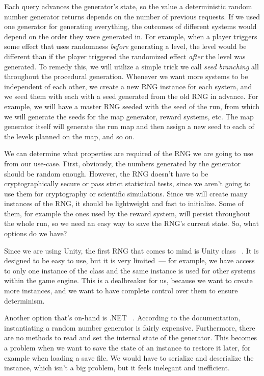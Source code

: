 Each query advances the generator's state, so the value a deterministic random number generator returns depends on the number of previous requests.
If we used one generator for generating everything, the outcomes of different systems would depend on the order they were generated in.
For example, when a player triggers some effect that uses randomness \emph{before} generating a level, the level would be different than if the player triggered the randomized effect \emph{after} the level was generated.
To remedy this, we will utilize a simple trick we call \emph{seed branching} all throughout the procedural generation.
Whenever we want more systems to be independent of each other, we create a new RNG instance for each system, and we seed them with each with a seed generated from the old RNG in advance.
For example, we will have a master RNG seeded with the seed of the run, from which we will generate the seeds for the map generator, reward systems, etc.
The map generator itself will generate the run map and then assign a new seed to each of the levels planned on the map, and so on.

We can determine what properties are required of the RNG we are going to use from our use-case.
First, obviously, the numbers generated by the generator should be random enough.
However, the RNG doesn't have to be cryptographically secure or pass strict statistical tests, since we aren't going to use them for cryptography or scientific simulations.
Since we will create many instances of the RNG, it should be lightweight and fast to initialize.
Some of them, for example the ones used by the reward system, will persist throughout the whole run, so we need an easy way to save the RNG's current state.
So, what options do we have?

Since we are using Unity, the first RNG that comes to mind is Unity class ~\cite{UnityRandom}.
It is designed to be easy to use, but it is very limited~--- for example, we have access to only one instance of the class and the same instance is used for other systems within the game engine.
This is a dealbreaker for us, because we want to create more instances, and we want to have complete control over them to ensure determinism.

Another option that's on-hand is .NET ~\cite{SystemRandom}.
According to the documentation, instantiating a random number generator is fairly expensive.
Furthermore, there are no methods to read and set the internal state of the generator.
This becomes a problem when we want to save the state of an instance to restore it later, for example when loading a save file.
We would have to serialize and deserialize the instance, which isn't a big problem, but it feels inelegant and inefficient.

